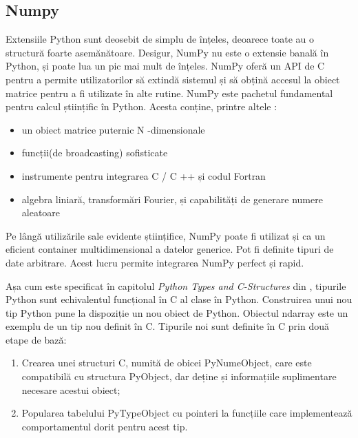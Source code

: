 
\subsection{Numpy}

Extensiile Python sunt deosebit de simplu de înțeles, deoarece toate au o structură foarte asemănătoare. Desigur, NumPy nu este o extensie banală în Python, și poate lua un pic mai mult de înțeles. NumPy oferă un API de C pentru a permite utilizatorilor să extindă sistemul și să obțină accesul la obiect matrice pentru a fi utilizate în alte rutine. NumPy este pachetul fundamental pentru calcul științific în Python. Acesta conține, printre altele :

\begin{itemize}
  \item un obiect matrice puternic N -dimensionale
  \item funcții(de broadcasting) sofisticate
  \item instrumente pentru integrarea C / C ++ și codul Fortran
  \item algebra liniară, transformări Fourier, și capabilități de generare numere aleatoare
\end{itemize}

Pe lângă utilizările sale evidente științifice, NumPy poate fi utilizat și ca un eficient container multidimensional a datelor generice. Pot fi definite tipuri de date arbitrare. Acest lucru permite integrarea NumPy perfect și rapid.

Așa cum este specificat în capitolul \textit{Python Types and C-Structures} din \cite{numpy}, tipurile Python sunt echivalentul funcțional în C al clase în Python. Construirea unui nou tip Python pune la dispoziție un nou obiect de Python. Obiectul ndarray este un exemplu de un tip nou definit în C. Tipurile noi sunt definite în C prin două etape de bază:
\begin{enumerate}
  \item Crearea unei structuri C, numită de obicei Py{Nume}Object, care este compatibilă cu structura PyObject, dar deține și informațiile suplimentare necesare acestui obiect;
  \item Popularea tabelului PyTypeObject cu pointeri la funcțiile care implementează comportamentul dorit pentru acest tip.
\end{enumerate} 


